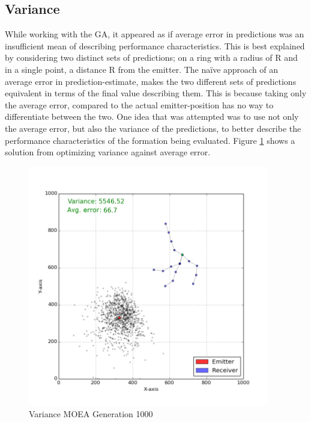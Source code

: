 \documentclass[10pt,a4paper]{book}
\begin{document}
\newpage



\subsection{Variance}

While working with the \gls{GA}, it appeared as if average error in predictions was an insufficient mean of describing performance characteristics. This is best explained by considering two distinct sets of predictions; on a ring with a radius of R and in a single point, a distance R from the emitter. The naïve approach of an average error in prediction-estimate, makes the two different sets of predictions equivalent in terms of the final value describing them. This is because taking only the average error, compared to the actual emitter-position has no way to differentiate between the two. One idea that was attempted was to use not only the average error, but also the variance of the predictions, to better describe the performance characteristics of the formation being evaluated. Figure \ref{MOEA_VAR_SOLUTION} shows a solution from optimizing variance against average error.



\begin{figure}[H]
\centering
\includegraphics[width=105mm]{variancemoea_gen1000.png}
\caption{Variance \acrshort{MOEA} Generation 1000}
\label{MOEA_VAR_SOLUTION}
\end{figure}

\newpage
\end{document}
